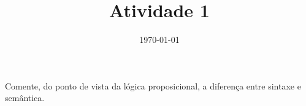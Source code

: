 \documentclass[a4paper, 11pt]{article}
\date{\today}
\title{Atividade 1}
\begin{document}
    \begin{question}
        Comente, do ponto de vista da lógica proposicional, a diferença entre sintaxe e semântica.
    \end{question}


        
\end{document}
